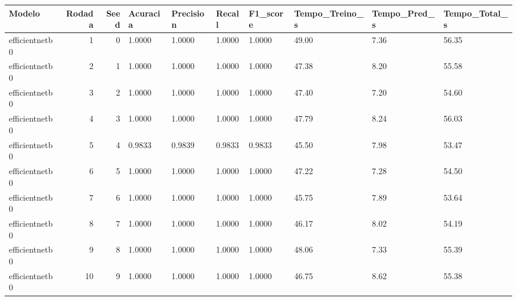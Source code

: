 \begin{tabular}{lrrlllllll}
\toprule
Modelo & Rodada & Seed & Acuracia & Precision & Recall & F1_score & Tempo_Treino_s & Tempo_Pred_s & Tempo_Total_s \\
\midrule
efficientnetb0 & 1 & 0 & 1.0000 & 1.0000 & 1.0000 & 1.0000 & 49.00 & 7.36 & 56.35 \\
efficientnetb0 & 2 & 1 & 1.0000 & 1.0000 & 1.0000 & 1.0000 & 47.38 & 8.20 & 55.58 \\
efficientnetb0 & 3 & 2 & 1.0000 & 1.0000 & 1.0000 & 1.0000 & 47.40 & 7.20 & 54.60 \\
efficientnetb0 & 4 & 3 & 1.0000 & 1.0000 & 1.0000 & 1.0000 & 47.79 & 8.24 & 56.03 \\
efficientnetb0 & 5 & 4 & 0.9833 & 0.9839 & 0.9833 & 0.9833 & 45.50 & 7.98 & 53.47 \\
efficientnetb0 & 6 & 5 & 1.0000 & 1.0000 & 1.0000 & 1.0000 & 47.22 & 7.28 & 54.50 \\
efficientnetb0 & 7 & 6 & 1.0000 & 1.0000 & 1.0000 & 1.0000 & 45.75 & 7.89 & 53.64 \\
efficientnetb0 & 8 & 7 & 1.0000 & 1.0000 & 1.0000 & 1.0000 & 46.17 & 8.02 & 54.19 \\
efficientnetb0 & 9 & 8 & 1.0000 & 1.0000 & 1.0000 & 1.0000 & 48.06 & 7.33 & 55.39 \\
efficientnetb0 & 10 & 9 & 1.0000 & 1.0000 & 1.0000 & 1.0000 & 46.75 & 8.62 & 55.38 \\
\bottomrule
\end{tabular}
